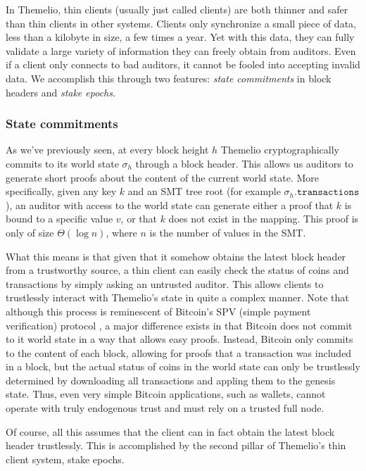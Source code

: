 \documentclass[letterpaper,12pt,oneside]{article}
\begin{document}
In Themelio, thin clients (usually just called clients) are both thinner and safer than thin clients in other systems. Clients only synchronize a small piece of data, less than a kilobyte in size, a few times a year. Yet with this data, they can fully validate a large variety of information they can freely obtain from auditors. Even if a client only connects to bad auditors, it cannot be fooled into accepting invalid data. We accomplish this through two features: \textit{state commitments} in block headers and \textit{stake epochs}.

\subsubsection{State commitments}

As we've previously seen, at every block height $h$ Themelio cryptographically commits to its world state $\sigma_h$ through a block header. This allows us auditors to generate short proofs about the content of the current world state. More specifically, given any key $k$ and an SMT tree root (for example $\sigma_h.\mathtt{transactions}$), an auditor with access to the world state can generate either a proof that $k$ is bound to a specific value $v$, or that $k$ does not exist in the mapping. This proof is only of size $\Theta(\log n)$, where $n$ is the number of values in the SMT.

What this means is that given that it somehow obtains the latest block header from a trustworthy source, a thin client can easily check the status of coins and transactions by simply asking an untrusted auditor. This allows clients to trustlessly interact with Themelio's state in quite a complex manner. Note that although this process is reminescent of Bitcoin's SPV (simple payment verification) protocol \cite{nakamoto2008bitcoin}, a major difference exists in that Bitcoin does not commit to it world state in a way that allows easy proofs. Instead, Bitcoin only commits to the content of each block, allowing for proofs that a transaction was included in a block, but the actual status of coins in the world state can only be trustlessly determined by downloading all transactions and appling them to the genesis state. Thus, even very simple Bitcoin applications, such as wallets, cannot operate with truly endogenous trust and must rely on a trusted full node.

Of course, all this assumes that the client can in fact obtain the latest block header trustlessly. This is accomplished by the second pillar of Themelio's thin client system, stake epochs.
\end{document}
